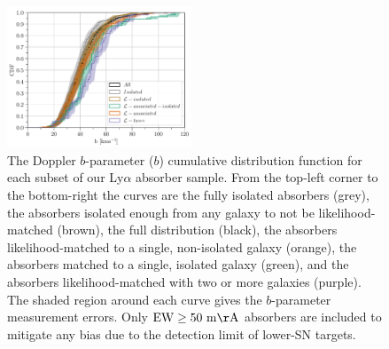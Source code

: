 \documentclass[twocolumn,tighten]{aastex62}
\begin{document}
\begin{figure}[t!]
        \centering
        \vspace{0pt}
        \includegraphics[width=0.49\textwidth]{hist(b)_all6_bins1_EWcut50-10000_errTrue_dataset_double.pdf}
        \caption{\small{The Doppler $b$-parameter ($b$) cumulative distribution function for each subset of our Ly$\alpha$ absorber sample. From the top-left corner to the bottom-right the curves are the fully isolated absorbers (grey), the absorbers isolated enough from any galaxy to not be likelihood-matched (brown), the full distribution (black), the absorbers likelihood-matched to a single, non-isolated galaxy (orange), the absorbers matched to a single, isolated galaxy (green), and the absorbers likelihood-matched with two or more galaxies (purple). The shaded region around each curve gives the $b$-parameter measurement errors. Only $\rm EW \ge 50~m\AA$ absorbers are included to mitigate any bias due to the detection limit of lower-SN targets.}}
        \vspace{5pt}
        \label{cdf_b}
\end{figure}


\end{document}
